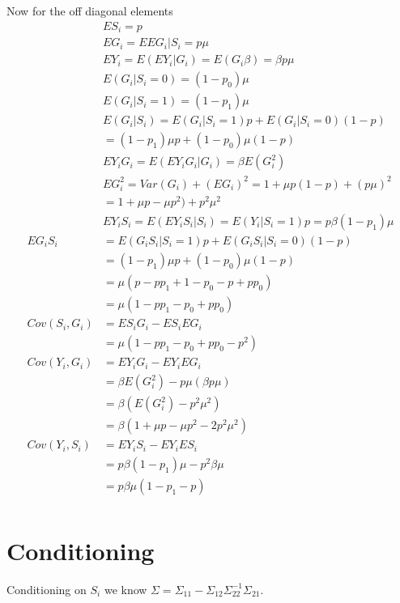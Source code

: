 \documentclass{article}
\begin{document}
Now for the off diagonal elements
\begin{align*}
       & ES_i = p \\
       & EG_i = EEG_i|S_i = p\mu \\
       & EY_i = E(EY_i|G_i) = E(G_i\beta) = \beta p\mu \\ 
       & E(G_i|S_i=0) = (1-p_0)\mu  \\
       & E(G_i|S_i=1) = (1-p_1)\mu  \\
       & E(G_i|S_i) = E(G_i|S_i=1)p + E(G_i|S_i=0)(1-p) \\
       & = (1-p_1)\mu p + (1-p_0)\mu(1-p) \\
       & EY_iG_i = E(EY_iG_i|G_i) = \beta E(G_i^2)  \\
       & EG_i^2 = Var(G_i) + (EG_i)^2 = 1+\mu p(1-p) + (p\mu)^2  \\
       & = 1+\mu p-\mu p^2) + p^2\mu^2 \\
       & EY_iS_i = E(EY_iS_i|S_i) = E(Y_i|S_i=1)p = p \beta (1-p_1)\mu \\
  EG_iS_i & = E(G_iS_i|S_i=1)p + E(G_iS_i|S_i=0)(1-p) \\
          & = (1-p_1)\mu p + (1-p_0)\mu(1-p) \\
          & = \mu(p-pp_1 + 1- p_0- p +pp_0) \\
          & = \mu(1-pp_1 - p_0 +pp_0) \\
  Cov(S_i, G_i) & = ES_iG_i - ES_iEG_i \\
                & = \mu(1-pp_1 - p_0 +pp_0 - p^2)  \\
  Cov(Y_i, G_i) & = EY_iG_i - EY_iEG_i \\
                & = \beta E(G_i^2) - p\mu(\beta p\mu) \\
                & = \beta( E(G_i^2) - p^2\mu^2) \\
                & = \beta(1+\mu p-\mu p^2 - 2p^2\mu^2) \\
  Cov(Y_i, S_i) & = EY_iS_i - EY_iES_i \\
                & = p \beta (1-p_1)\mu - p^2\beta \mu \\
                & = p \beta \mu (1- p_1 - p) \\
\end{align*}

\section{Conditioning}
Conditioning on $S_i$ we know $\Sigma = \Sigma_{11} - \Sigma_{12}\Sigma_{22}^{-1}\Sigma_{21}$. 
\end{document}
